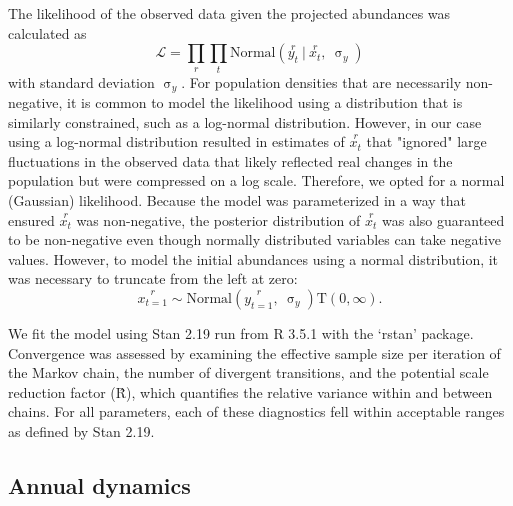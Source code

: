{The likelihood of the observed data given the projected abundances was calculated as
%
\begin{equation} \label{eq:likelihood}
\mathcal{L} = 
\displaystyle\prod_{r}
\displaystyle\prod_{t}
\text{Normal}
\left(
\overset{r}{y_t}~|~\overset{r}{x_t},~\upsigma_y
\right)
\end{equation}
%
with standard deviation $\upsigma_y$.
For population densities that are necessarily non-negative, 
it is common to model the likelihood using a distribution that is similarly constrained,
such as a log-normal distribution. 
However, in our case using a log-normal distribution resulted in estimates of 
$\overset{r}{x_t}$ that "ignored" large fluctuations in the observed data 
that likely reflected real changes in the population but were compressed on a log scale. 
Therefore, we opted for a normal (Gaussian) likelihood. 
Because the model was parameterized in a way that ensured
$\overset{r}{x_t}$ was non-negative,
the posterior distribution of $\overset{r}{x_t}$ was also guaranteed to be non-negative
even though normally distributed variables can take negative values. 
However, to model the initial abundances using a normal distribution,
it was necessary to truncate from the left at zero:
%
\begin{equation} \label{eq:x0}
\overset{r}{x_{t=1}} \sim
\text{Normal}
\left(
\overset{r}{y_{t=1}},~\upsigma_y
\right) \text{T}(0, \infty)
\text{.}
\end{equation}
%

We fit the model using Stan 2.19 run from R 3.5.1
with the ‘rstan’ package.
Convergence was assessed by examining the effective sample size 
per iteration of the Markov chain, 
the number of divergent transitions, 
and the potential scale reduction factor (\^{R}),
which quantifies the relative variance within and between chains. 
For all parameters, each of these diagnostics fell within 
acceptable ranges as defined by Stan 2.19.


\subsection*{Annual dynamics}

}
